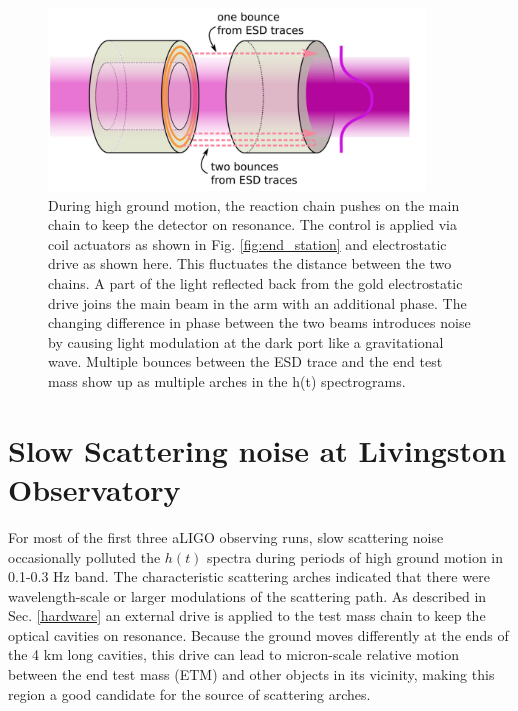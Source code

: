 \documentclass[12pt]{iopart}
\begin{document}
\begin{figure}[h]
    \centering
    \includegraphics[width=10cm]{mirror-diag1.png}
    \caption{During high ground motion, the reaction chain pushes on the main chain  to keep the detector on resonance. The control is applied via coil actuators as shown in Fig. \ref{fig:end_station} and electrostatic drive as shown here. This fluctuates the distance between the two chains. A part of the light reflected back from the gold electrostatic drive joins the main beam in the arm with an additional phase. The changing difference in phase between the two beams introduces noise by causing light modulation at the dark port like a gravitational wave. Multiple bounces between the ESD trace and the end test mass show up as multiple arches in the h(t) spectrograms.}
    \label{fig:mirror_diag}
\end{figure}


\section{Slow Scattering noise at Livingston Observatory}\label{m0r0_scattering}
For most of the first three aLIGO observing runs, slow scattering noise occasionally polluted the $h(t)$ spectra during periods of high ground motion in 0.1-0.3 Hz band. The characteristic scattering arches indicated that there were wavelength-scale or larger modulations of the scattering path.
As described in Sec. \ref{hardware} an external drive is applied to the test mass chain to keep the optical cavities on resonance. Because the ground moves differently at the ends of the 4 km long cavities, this drive can lead to micron-scale relative motion between the end test mass (ETM) and other objects in its vicinity, making this region a good candidate for the source of scattering arches.
\end{document}
